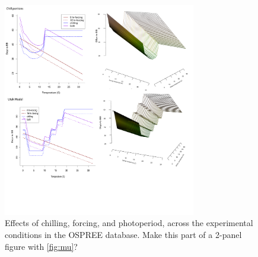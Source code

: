 \documentclass{article}
\begin{document}
\newpage
\begin{figure}[h!]
\centering
\noindent \includegraphics[width=0.75\textwidth]{..//..//analyses/bb_analysis/figures/bbmod_3dplot_4panels.pdf}
\caption{Effects of chilling, forcing, and photoperiod, across the experimental conditions in the OSPREE database. Make this part of a 2-panel figure with \ref{fig:mu}?}
\label{fig:apc}
\end{figure}


\newpage
\end{document}
